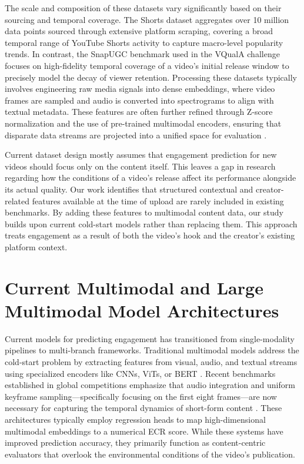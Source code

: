 The scale and composition of these datasets vary significantly based on their sourcing and temporal coverage. The Shorts dataset \cite{violot2024shorts} aggregates over 10 million data points sourced through extensive platform scraping, covering a broad temporal range of YouTube Shorts activity to capture macro-level popularity trends. In contrast, the SnapUGC benchmark used in the VQualA challenge \cite{li2025vquala} focuses on high-fidelity temporal coverage of a video's initial release window to precisely model the decay of viewer retention. Processing these datasets typically involves engineering raw media signals into dense embeddings, where video frames are sampled and audio is converted into spectrograms to align with textual metadata. These features are often further refined through Z-score normalization and the use of pre-trained multimodal encoders, ensuring that disparate data streams are projected into a unified space for evaluation \cite{li2024delving, violot2024shorts}.

Current dataset design mostly assumes that engagement prediction for new videos should focus only on the content itself. This leaves a gap in research regarding how the conditions of a video's release affect its performance alongside its actual quality. Our work identifies that structured contextual and creator-related features available at the time of upload are rarely included in existing benchmarks. By adding these features to multimodal content data, our study builds upon current cold-start models rather than replacing them. This approach treats engagement as a result of both the video's hook and the creator's existing platform context.


\section{Current Multimodal and Large Multimodal Model Architectures}

Current models for predicting engagement has transitioned from single-modality pipelines to multi-branch frameworks. Traditional multimodal models address the cold-start problem by extracting features from visual, audio, and textual streams using specialized encoders like CNNs, ViTs, or BERT \cite{cho2024amps, guan2025mmf}. Recent benchmarks established in global competitions emphasize that audio integration and uniform keyframe sampling—specifically focusing on the first eight frames—are now necessary for capturing the temporal dynamics of short-form content \cite{li2025vquala, sun2025engagement}. These architectures typically employ regression heads to map high-dimensional multimodal embeddings to a numerical ECR score. While these systems have improved prediction accuracy, they primarily function as content-centric evaluators that overlook the environmental conditions of the video's publication.

